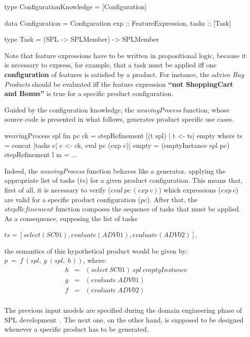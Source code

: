  \begin{code}
 type ConfigurationKnowledge = [Configuration]

 data Configuration = Configuration {
  exp :: FeatureExpression,
  tasks :: [Task] 	
 }

 type Task = (SPL -> SPLMember) -> SPLMember
\end{code}

{\color{red}Note that feature expressions have to be written in propositional
logic, because it is necessary to express, for example, that a task must be
applied iff one {\bf configuration} of features is satisfied by a product. For
instance, the advice \emph{Buy Products} should be evaluated iff the feature
expression {\bf ``not ShoppingCart and Bonus''} is true for a specific product
configuration.

Guided by the configuration knowledge, the \emph{weavingProcess} function, whose
source code is presented in what follows, generates product specific use cases.}

\begin{code}
weavingProcess spl fm pc ck =
   stepRefinement [(t spl) | t <- ts] empty 
   where
    ts = concat [tasks c| c <- ck, eval pc (exp c)] 
    empty = (emptyInstance spl pc)
    stepRefinement l m = ...
 \end{code}
 
Indeed, the \emph{weavingProcess} function behaves like a generator, applying
the appropriate list of tasks ($ts$) for a given product configuration. This means 
that, first of all, it is necessary to verify  ($eval\ pc\ (exp\ c)$) which expressions ($exp\ c$) 
are valid for a specific product configuration ($pc$). After that, the
$stepRefinement$ function composes the sequence of tasks that must be applied. 
As a consequence, supposing the list of tasks
 
$ts=[select(SC01),evaluate(ADV01),evaluate(ADV02)]$,
 
the semantics of this hypothetical product would be given by: $p\ =\  f\ (spl,\ g\ (spl,\ h))$, where:
\begin{eqnarray*}
h  & = & (select\ SC01)\ spl\ emptyInstance \\
g  & = & (evaluate\ ADV01) \\
f   & = & (evaluate\ ADV02) \\
\end{eqnarray*}

{\color{red}The previous input models are specified during the domain
engineering phase of SPL development~\cite{Clements:2001aa,Pohl:2005aa}. The next
one, on the other hand, is supposed to be designed whenever a specific product
has to be generated. }

